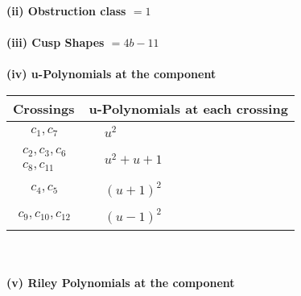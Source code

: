 \documentclass[1p]{elsarticle_modified}
\theoremstyle{definition}
\begin{document}
\flushleft \textbf{(ii) Obstruction class $= 1$}\\~\\
\flushleft \textbf{(iii) Cusp Shapes $= 4 b-11$}\\~\\
\newpage\renewcommand{\arraystretch}{1}
\flushleft \textbf{(iv) u-Polynomials at the component}\newline \\
\begin{tabular}{m{50pt}|m{274pt}}
Crossings & \hspace{64pt}u-Polynomials at each crossing \\
\hline $$\begin{aligned}c_{1},c_{7}\end{aligned}$$&$\begin{aligned}
&u^2
\end{aligned}$\\
\hline $$\begin{aligned}c_{2},c_{3},c_{6}\\c_{8},c_{11}\end{aligned}$$&$\begin{aligned}
&u^2+u+1
\end{aligned}$\\
\hline $$\begin{aligned}c_{4},c_{5}\end{aligned}$$&$\begin{aligned}
&(u+1)^2
\end{aligned}$\\
\hline $$\begin{aligned}c_{9},c_{10},c_{12}\end{aligned}$$&$\begin{aligned}
&(u-1)^2
\end{aligned}$\\
\hline
\end{tabular}\\~\\
\newpage\renewcommand{\arraystretch}{1}
\flushleft \textbf{(v) Riley Polynomials at the component}\newline \\
\end{document}
